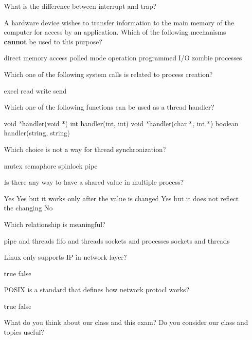 \documentclass[12pt]{exam}
\begin{document}
\begin{questions}

\question[2] What is the difference between interrupt and trap?
\makeemptybox{\fill}
\addpoints

\newpage

\question[1] A hardware device wishes to transfer information to the main memory of the
computer for access by an application. Which of the following mechanisms \textbf{cannot} be used
to this purpose?
\begin{choices}
        \choice direct memory access
        \choice polled mode operation
        \choice programmed I/O
        \choice zombie processes
\end{choices}

\question[1] Which one of the following system calls is related to process creation?
\begin{choices}
        \choice execl
        \choice read
        \choice write
        \choice send
\end{choices}

\question[1] Which one of the following functions can be used as a thread handler?
\begin{choices}
        \choice void *handler(void *)
        \choice int handler(int, int)
        \choice void *handler(char *, int *)
        \choice boolean handler(string, string)
\end{choices}

\question[1] Which choice is not a way for thread synchronization?
\begin{choices}
        \choice mutex
        \choice semaphore
        \choice spinlock
        \choice pipe
\end{choices}

\question[1] Is there any way to have a shared value in multiple process?
\begin{choices}
        \choice Yes
        \choice Yes but it works only after the value is changed
        \choice Yes but it does not reflect the changing
        \choice No
\end{choices}

\question[1] Which relationship is meaningful?
\begin{choices}
        \choice pipe and threads
        \choice fifo and threads
        \choice sockets and processes
        \choice sockets and threads
\end{choices}

\newpage

\question[1] Linux only supports IP in network layer?
\begin{choices}
        \choice true
        \choice false
\end{choices}

\question[1] POSIX is a standard that defines how network protocl works?
\begin{choices}
        \choice true
        \choice false
\end{choices}

\question[0]
What do you think about our class and this exam? Do you consider our class and topics
useful?
\makeemptybox{\fill}

\end{questions}
\end{document}
